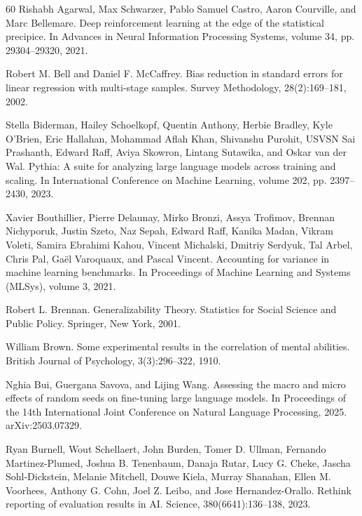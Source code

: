 \begin{thebibliography}{60}
Rishabh Agarwal, Max Schwarzer, Pablo Samuel Castro, Aaron Courville, and Marc Bellemare. Deep reinforcement learning at the edge of the statistical precipice. In Advances in Neural Information Processing Systems, volume 34, pp. 29304--29320, 2021.

Robert M. Bell and Daniel F. McCaffrey. Bias reduction in standard errors for linear regression with multi-stage samples. Survey Methodology, 28(2):169--181, 2002.

Stella Biderman, Hailey Schoelkopf, Quentin Anthony, Herbie Bradley, Kyle O'Brien, Eric Hallahan, Mohammad Aflah Khan, Shivanshu Purohit, USVSN Sai Prashanth, Edward Raff, Aviya Skowron, Lintang Sutawika, and Oskar van der Wal. Pythia: A suite for analyzing large language models across training and scaling. In International Conference on Machine Learning, volume 202, pp. 2397--2430, 2023.

Xavier Bouthillier, Pierre Delaunay, Mirko Bronzi, Assya Trofimov, Brennan Nichyporuk, Justin Szeto, Naz Sepah, Edward Raff, Kanika Madan, Vikram Voleti, Samira Ebrahimi Kahou, Vincent Michalski, Dmitriy Serdyuk, Tal Arbel, Chris Pal, Ga\"{e}l Varoquaux, and Pascal Vincent. Accounting for variance in machine learning benchmarks. In Proceedings of Machine Learning and Systems (MLSys), volume 3, 2021.

Robert L. Brennan. Generalizability Theory. Statistics for Social Science and Public Policy. Springer, New York, 2001.

William Brown. Some experimental results in the correlation of mental abilities. British Journal of Psychology, 3(3):296--322, 1910.

Nghia Bui, Guergana Savova, and Lijing Wang. Assessing the macro and micro effects of random seeds on fine-tuning large language models. In Proceedings of the 14th International Joint Conference on Natural Language Processing, 2025. arXiv:2503.07329.

Ryan Burnell, Wout Schellaert, John Burden, Tomer D. Ullman, Fernando Martinez-Plumed, Joshua B. Tenenbaum, Danaja Rutar, Lucy G. Cheke, Jascha Sohl-Dickstein, Melanie Mitchell, Douwe Kiela, Murray Shanahan, Ellen M. Voorhees, Anthony G. Cohn, Joel Z. Leibo, and Jose Hernandez-Orallo. Rethink reporting of evaluation results in AI. Science, 380(6641):136--138, 2023.


\end{thebibliography}
